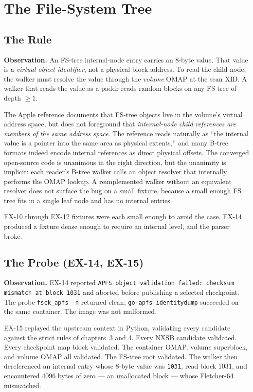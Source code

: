 \chapter{The File-System Tree}
\label{ssec:fs-tree-internal}

\section{The Rule}

\textbf{Observation.} An FS-tree internal-node entry carries an
8-byte value. That value is a \emph{virtual object identifier},
not a physical block address. To read the child node, the walker
must resolve the value through the \emph{volume} OMAP at the scan
XID. A walker that reads the value as a paddr reads random blocks
on any FS tree of depth $\geq 1$.

The Apple reference documents that FS-tree objects live in the
volume's virtual address space, but does not foreground that
\emph{internal-node child references are members of the same
address space}. The reference reads naturally as ``the internal
value is a pointer into the same area as physical extents,'' and
many B-tree formats indeed encode internal references as direct
physical offsets. The converged open-source code is unanimous in
the right direction, but the unanimity is implicit: each reader's
B-tree walker calls an object resolver that internally performs
the OMAP lookup. A reimplemented walker without an equivalent
resolver does not surface the bug on a small fixture, because a
small enough FS tree fits in a single leaf node and has no internal
entries.

EX-10 through EX-12 fixtures were each small enough to avoid the
case. EX-14 produced a fixture dense enough to require an internal
level, and the parser broke.

\section{The Probe (EX-14, EX-15)}

\textbf{Observation.} EX-14 reported
\texttt{APFS object validation failed: checksum mismatch at block
1031} and aborted before publishing a selected checkpoint. The probe
\texttt{fsck\_apfs -n} returned clean; \texttt{go-apfs identitydump}
succeeded on the same container. The image was not malformed.

EX-15 replayed the upstream context in Python, validating every
candidate against the strict rules of chapters~3 and 4. Every NXSB
candidate validated. Every checkpoint map block validated. The
container OMAP, volume superblock, and volume OMAP all validated.
The FS-tree root validated. The walker then dereferenced an internal
entry whose 8-byte value was \texttt{1031}, read block 1031, and
encountered 4096 bytes of zero --- an unallocated block --- whose
Fletcher-64 mismatched.

